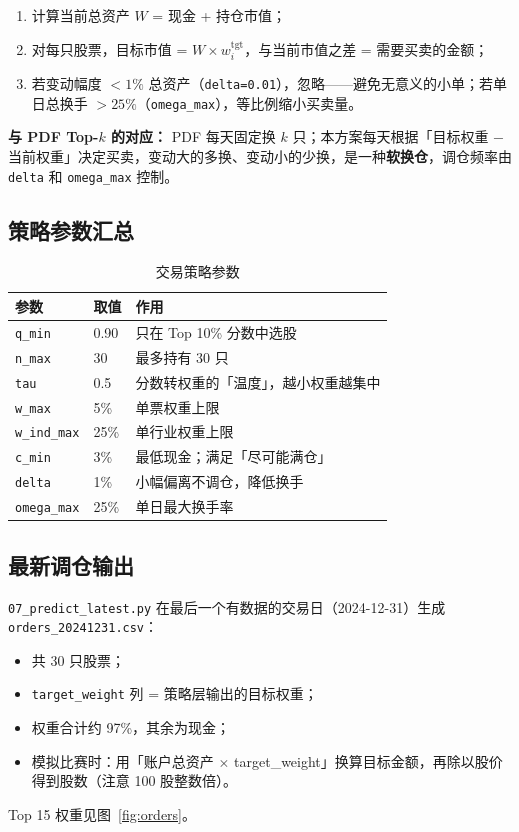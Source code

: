 \documentclass[UTF8,a4paper,12pt]{ctexart}
\begin{document}
\begin{enumerate}[leftmargin=2em]
  \item 计算当前总资产 $W$ = 现金 + 持仓市值；
  \item 对每只股票，目标市值 = $W \times w_i^{\mathrm{tgt}}$，与当前市值之差 = 需要买卖的金额；
  \item 若变动幅度 $< 1\%$ 总资产（\texttt{delta=0.01}），忽略——避免无意义的小单；若单日总换手 $> 25\%$（\texttt{omega\_max}），等比例缩小买卖量。
\end{enumerate}

\textbf{与 PDF Top-$k$ 的对应：} PDF 每天固定换 $k$ 只；本方案每天根据「目标权重 $-$ 当前权重」决定买卖，变动大的多换、变动小的少换，是一种\textbf{软换仓}，调仓频率由 \texttt{delta} 和 \texttt{omega\_max} 控制。

\subsection{策略参数汇总}

\begin{table}[H]
\centering
\caption{交易策略参数}
\label{tab:strategy}
\begin{tabular}{llp{5.5cm}}
\toprule
\textbf{参数} & \textbf{取值} & \textbf{作用} \\
\midrule
\texttt{q\_min} & 0.90 & 只在 Top 10\% 分数中选股 \\
\texttt{n\_max} & 30 & 最多持有 30 只 \\
\texttt{tau} & 0.5 & 分数转权重的「温度」，越小权重越集中 \\
\texttt{w\_max} & 5\% & 单票权重上限 \\
\texttt{w\_ind\_max} & 25\% & 单行业权重上限 \\
\texttt{c\_min} & 3\% & 最低现金；满足「尽可能满仓」 \\
\texttt{delta} & 1\% & 小幅偏离不调仓，降低换手 \\
\texttt{omega\_max} & 25\% & 单日最大换手率 \\
\bottomrule
\end{tabular}
\end{table}

\subsection{最新调仓输出}

\texttt{07\_predict\_latest.py} 在最后一个有数据的交易日（2024-12-31）生成 \texttt{orders\_20241231.csv}：
\begin{itemize}[leftmargin=2em]
  \item 共 30 只股票；
  \item \texttt{target\_weight} 列 = 策略层输出的目标权重；
  \item 权重合计约 97\%，其余为现金；
  \item 模拟比赛时：用「账户总资产 $\times$ target\_weight」换算目标金额，再除以股价得到股数（注意 100 股整数倍）。
\end{itemize}
Top 15 权重见图~\ref{fig:orders}。
\end{document}
